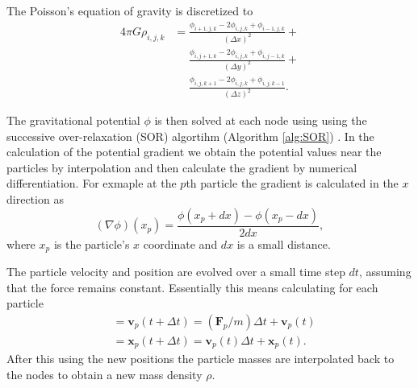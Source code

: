 \documentclass[notitlepage, 12pt]{article}
\begin{document}
The Poisson's equation of gravity is discretized to 
\begin{equation}
\begin{aligned}
4\pi G\rho_{i,j,k} &= \frac{\phi_{i+1,j,k}-2\phi_{i,j,k}+\phi_{i-1,j,k}}{(\Delta x)^2}+\\
& \phantom{{}={}} \frac{\phi_{i,j+1,k}-2\phi_{i,j,k}+\phi_{i,j-1,k}}{(\Delta y)^2}+\\
& \phantom{{}={}} \frac{\phi_{i,j,k+1}-2\phi_{i,j,k}+\phi_{i,j,k-1}}{(\Delta z)^2}.
\end{aligned}
\end{equation}

The gravitational potential $\phi$ is then solved at each node using using the successive over-relaxation (SOR) algortihm (Algorithm \ref{alg:SOR}) . In the calculation of the potential gradient we obtain the potential values near the particles by interpolation and then calculate the gradient by numerical differentiation. For exmaple at the $p$th particle the gradient is calculated in the $x$ direction as
\begin{equation}
(\nabla \phi)(x_p)=\frac{\phi(x_p+dx)-\phi(x_p-dx)}{2dx},
\end{equation}
where $x_p$ is the particle's $x$ coordinate and $dx$ is a small distance.  

The particle velocity and position are evolved over a small time step $dt$, assuming that the force remains constant. Essentially this means calculating for each particle
\begin{align}
&=\mathbf{v}_p(t+\Delta t) = (\mathbf{F}_p/m)\Delta t + \mathbf{v}_p(t)\\
&=\mathbf{x}_p(t+\Delta t) = \mathbf{v}_p(t)\Delta t + \mathbf{x}_p(t).
\end{align}
After this using the new positions the particle masses are interpolated back to the nodes to obtain a new mass density $\rho$.
\end{document}
